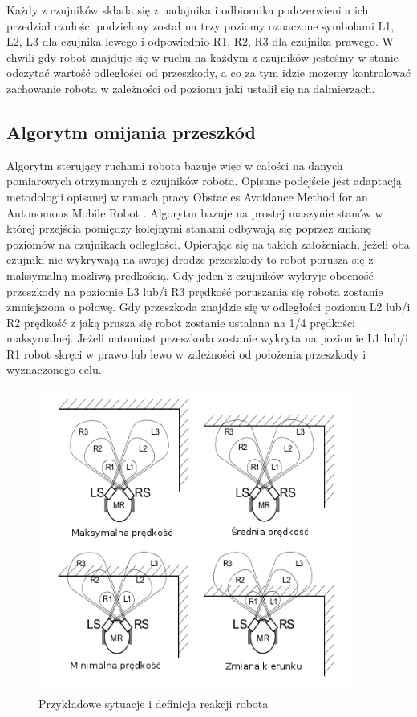 Każdy z czujników składa się z nadajnika i odbiornika podczerwieni a ich
przedział czułości podzielony został na trzy poziomy oznaczone symbolami L1, L2,
L3 dla czujnika lewego i odpowiednio R1, R2, R3 dla czujnika prawego. W chwili
gdy robot znajduje się w ruchu na każdym z czujników jesteśmy w stanie odczytać
wartość odległości od przeszkody, a co za tym idzie możemy kontrolować zachowanie
robota w zależności od poziomu jaki ustalił się na dalmierzach.

\subsection{Algorytm omijania przeszkód}
Algorytm sterujący ruchami robota bazuje więc w całości na danych pomiarowych
otrzymanych z czujników robota. Opisane podejście jest adaptacją metodologii
opisanej w ramach pracy Obstacles Avoidance Method for an Autonomous Mobile Robot
\cite{ObstaclesAvoidanceIR}. Algorytm bazuje na prostej maszynie stanów w której
przejścia pomiędzy kolejnymi stanami odbywają się poprzez zmianę poziomów na
czujnikach odległości. Opierając się na takich założeniach, jeżeli oba czujniki
nie wykrywają na swojej drodze przeszkody to robot porusza się z maksymalną
możliwą prędkością. Gdy jeden z czujników wykryje obecność przeszkody na poziomie
 L3 lub/i R3 prędkość poruszania się robota zostanie zmniejszona o połowę. Gdy
 przeszkoda znajdzie się w odległości poziomu L2 lub/i R2 prędkość z
jaką prusza się robot zostanie ustalana na 1/4 prędkości maksymalnej. Jeżeli
natomiast przeszkoda zostanie wykryta na poziomie L1 lub/i R1 robot skręci w
prawo lub lewo w zależności od położenia przeszkody i wyznaczonego celu.

\begin{figure}[hb]
 \centering
 \includegraphics[height=100mm]{../images/ch04/obs_avoid_algorithm.png}
 \caption{Przykładowe sytuacje i definicja reakcji robota}
 \label{fig:IRSensorPosition}
\end{figure}

